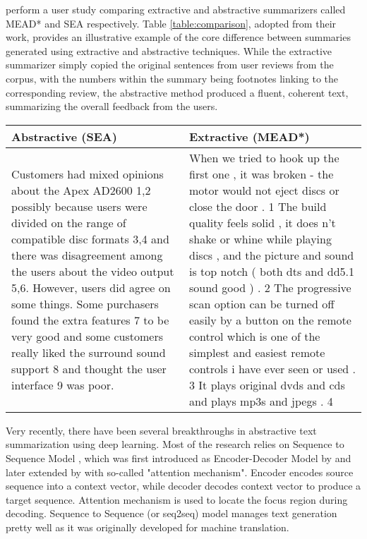 \documentclass[11pt,a4paper,onecolumn]{article}
\begin{document}
 perform a user study comparing extractive and abstractive summarizers called MEAD* and SEA respectively.
Table \ref{table:comparison}, adopted from their work, provides an illustrative example of the core difference between summaries generated using extractive and abstractive techniques.
While the extractive summarizer simply copied the original sentences from user reviews from the corpus, with the numbers within the summary being footnotes linking to the corresponding review, the abstractive method produced a fluent, coherent text, summarizing the overall feedback from the users.
\begin{table*}[ht]
\caption{Comparison of extractive and abstractive summarization}
\label{table:comparison}
\centering
\begin{tabular}{p{0.5\linewidth}p{0.5\linewidth}}
\hline
\textbf{Abstractive (SEA)} & \textbf{Extractive (MEAD*)}\\
\hline
Customers had mixed opinions about the Apex AD2600 1,2
possibly because users were divided on the range of compatible
disc formats 3,4 and there was disagreement among the users
about the video output 5,6. However, users did agree on some
things. Some purchasers found the extra features 7 to be very
good and some customers really liked the surround sound support
8 and thought the user interface 9 was poor.
&
When we tried to hook up the first one , it was broken - the
motor would not eject discs or close the door . 1 The build
quality feels solid , it does n't shake or whine while playing
discs , and the picture and sound is top notch ( both dts and
dd5.1 sound good ) . 2 The progressive scan option can be
turned off easily by a button on the remote control which is
one of the simplest and easiest remote controls i have ever
seen or used . 3 It plays original dvds and cds and plays
mp3s and jpegs . 4 \\
\hline
\end{tabular}
\end{table*}

Very recently, there have been several breakthroughs in abstractive text summarization using deep learning.
Most of the research relies on Sequence to Sequence Model \cite{sutskever2014sequence}, which was first introduced as Encoder-Decoder Model by  and later extended by  with so-called "attention mechanism".
Encoder encodes source sequence into a context vector, while decoder decodes context vector to produce a target sequence. Attention mechanism is used to locate the focus region  during decoding.
Sequence to Sequence (or seq2seq) model manages text generation pretty well as it was originally developed for machine translation.
\end{document}
